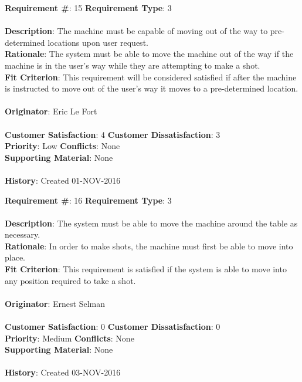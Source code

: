 \documentclass[titlepage]{article}
\begin{document}
\begin{framed}
	\noindent\textbf{Requirement \#}: 15 \hfill \textbf{Requirement Type}: 3 \hfill\\\\
	\noindent\textbf{Description}: The machine must be capable of moving out of the way to pre-determined locations upon user request.\\
	\textbf{Rationale}: The system must be able to move the machine out of the way if the machine is in the user's way while they are attempting to make a shot.\\
	\textbf{Fit Criterion}: This requirement will be considered satisfied if after the machine is instructed to move out of the user's way it moves to a pre-determined location.\\\\
	\textbf{Originator}: Eric Le Fort\\\\
	\noindent\textbf{Customer Satisfaction}: 4 \hfill 	\textbf{Customer Dissatisfaction}: 3 \hfill\\
	\textbf{Priority}: Low \hfill \textbf{Conflicts}: None \hfill\\
	\textbf{Supporting Material}: None\\\\
	\noindent\textbf{History}: Created 01-NOV-2016
\end{framed}

\begin{framed}
	\noindent\textbf{Requirement \#}: 16 \hfill \textbf{Requirement Type}: 3 \hfill\\\\
	\noindent\textbf{Description}: The system must be able to move the machine around the table as necessary. \\
	\textbf{Rationale}: In order to make shots, the machine must first be able to move into place.\\
	\textbf{Fit Criterion}: This requirement is satisfied if the system is able to move into any position required to take a shot. \\\\
	\textbf{Originator}: Ernest Selman\\\\
	\noindent\textbf{Customer Satisfaction}: 0 \hfill 	\textbf{Customer Dissatisfaction}: 0 \hfill\\
	\textbf{Priority}: Medium \hfill \textbf{Conflicts}: None \hfill\\
	\textbf{Supporting Material}: None\\\\
	\noindent\textbf{History}: Created 03-NOV-2016
\end{framed}
\end{document}
